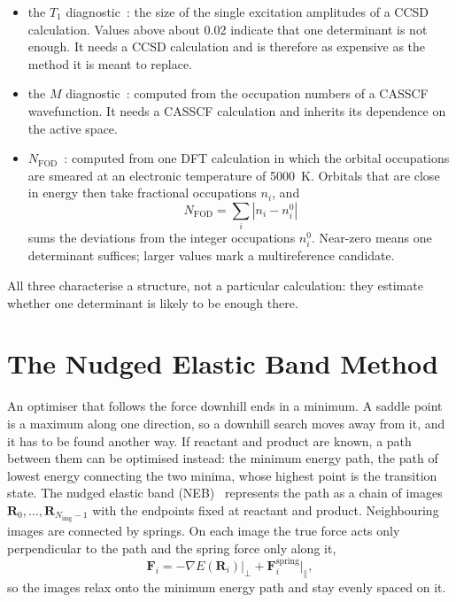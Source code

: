 \begin{itemize}
  \item the $T_1$ diagnostic~\cite{lee1989}: the size of the single
    excitation amplitudes of a CCSD calculation. Values above about 0.02
    indicate that one determinant is not enough. It needs a CCSD
    calculation and is therefore as expensive as the method it is meant
    to replace.
  \item the $M$ diagnostic~\cite{tishchenko2008}: computed from the
    occupation numbers of a CASSCF wavefunction. It needs a CASSCF
    calculation and inherits its dependence on the active space.
  \item $N_\text{FOD}$~\cite{grimme2015}: computed from one DFT
    calculation in which the orbital occupations are smeared at an
    electronic temperature of 5000~K. Orbitals that are close in energy
    then take fractional occupations $n_i$, and
    \begin{equation}
      N_\text{FOD} = \sum_i |n_i - n_i^0|
    \end{equation}
    sums the deviations from the integer occupations $n_i^0$. Near-zero
    means one determinant suffices; larger values mark a multireference
    candidate.
\end{itemize}

All three characterise a structure, not a particular calculation: they
estimate whether one determinant is likely to be enough there.

\section{The Nudged Elastic Band Method}
\label{sec:background-neb}

An optimiser that follows the force downhill ends in a minimum. A
saddle point is a maximum along one direction, so a downhill search
moves away from it, and it has to be found another way. If reactant
and product are known, a path between them can be optimised instead: the
minimum energy path, the path of lowest energy connecting the two minima,
whose highest point is the transition state. The nudged elastic band
(NEB)~\cite{jonsson1998, henkelman2000tangent} represents the path as a
chain of images $\mathbf{R}_0, \dots, \mathbf{R}_{N_\text{img}-1}$ with the
endpoints fixed at reactant and product. Neighbouring images are connected
by springs. On each image the true force acts only perpendicular to the
path and the spring force only along it,
%
\begin{equation}
  \mathbf{F}_i = -\nabla E(\mathbf{R}_i)\big|_\perp
               + \mathbf{F}_i^\text{spring}\big|_\parallel ,
\end{equation}
%
so the images relax onto the minimum energy path and stay evenly spaced on
it.

